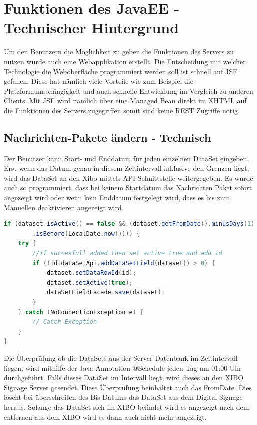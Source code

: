 \section{Funktionen des JavaEE - Technischer Hintergrund}
\label{sec:javaeetechnicalbackground}
Um den Benutzern die Möglichkeit zu geben die Funktionen des Servers zu nutzen wurde auch eine Webapplikation erstellt. Die Entscheidung mit welcher Technologie die Weboberfläche programmiert werden soll ist schnell auf JSF gefallen. Diese hat nämlich viele Vorteile wie zum Beispiel die Platzformunabhängigkeit und auch schnelle Entwicklung im Vergleich zu anderen Clients. Mit JSF wird nämlich über eine Managed Bean direkt im XHTML auf die Funktionen des Servers zugegriffen somit sind keine REST Zugriffe nötig.

\subsection{Nachrichten-Pakete ändern - Technisch}\label{sec:datasetexpiredatetechnical}
Der Benutzer kann Start- und Enddatum für jeden einzelnen DataSet eingeben. Erst wenn das Datum genau in diesem Zeitintervall inklusive den Grenzen liegt, wird das DataSet an den Xibo mittels API-Schnittstelle weitergegeben. Es wurde auch so programmiert, dass bei keinem Startdatum das Nachrichten Paket sofort angezeigt wird oder wenn kein Enddatum festgelegt wird, dass es bis zum Manuellen deaktivieren angezeigt wird.

\begin{lstlisting}[language=Java, caption={public void doCheckEvery24Hours()}]
if (dataset.isActive() == false && (dataset.getFromDate().minusDays(1)
        .isBefore(LocalDate.now()))) {
    try {
        //if succesfull added then set active true and add id
        if ((id=dataSetApi.addDataSetField(dataset)) > 0) {
            dataset.setDataRowId(id);
            dataset.setActive(true);
            dataSetFieldFacade.save(dataset);
        }
    } catch (NoConnectionException e) {
        // Catch Exception
    }
}
\end{lstlisting}

Die Überprüfung ob die DataSets aus der Server-Datenbank im Zeitintervall liegen, wird mithilfe der Java Annotation @Schedule jeden Tag um 01:00 Uhr durchgeführt. Falls dieses DataSet im Intervall liegt, wird dieses an den XIBO Signage Server gesendet. Diese Überprüfung beinhaltet auch das FromDate. Dies löscht bei überschreiten des Bis-Datums das DataSet aus dem Digital Signage heraus. Solange das DataSet sich im XIBO befindet wird es angezeigt nach dem entfernen aus dem XIBO wird es dann auch nicht mehr angezeigt.

